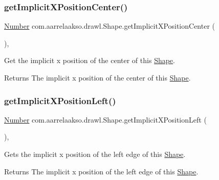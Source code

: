 \subsubsection{\texorpdfstring{get\+Implicit\+X\+Position\+Center()}{getImplicitXPositionCenter()}}
{\footnotesize\ttfamily \hyperlink{interfacecom_1_1aarrelaakso_1_1drawl_1_1_number}{Number} com.\+aarrelaakso.\+drawl.\+Shape.\+get\+Implicit\+X\+Position\+Center (\begin{DoxyParamCaption}{ }\end{DoxyParamCaption})\hspace{0.3cm}{\ttfamily [protected]}, {\ttfamily [inherited]}}



Get the implicit x position of the center of this \hyperlink{classcom_1_1aarrelaakso_1_1drawl_1_1_shape}{Shape}. 

\begin{DoxyReturn}{Returns}
The implicit x position of the center of this \hyperlink{classcom_1_1aarrelaakso_1_1drawl_1_1_shape}{Shape}. 
\end{DoxyReturn}
\mbox{\label{classcom_1_1aarrelaakso_1_1drawl_1_1_shape_a2f272e8bfa625bb7959d1f722d5ac3df}} 
\subsubsection{\texorpdfstring{get\+Implicit\+X\+Position\+Left()}{getImplicitXPositionLeft()}}
{\footnotesize\ttfamily \hyperlink{interfacecom_1_1aarrelaakso_1_1drawl_1_1_number}{Number} com.\+aarrelaakso.\+drawl.\+Shape.\+get\+Implicit\+X\+Position\+Left (\begin{DoxyParamCaption}{ }\end{DoxyParamCaption})\hspace{0.3cm}{\ttfamily [protected]}, {\ttfamily [inherited]}}



Gets the implicit x position of the left edge of this \hyperlink{classcom_1_1aarrelaakso_1_1drawl_1_1_shape}{Shape}. 

\begin{DoxyReturn}{Returns}
The implicit x position of the left edge of this \hyperlink{classcom_1_1aarrelaakso_1_1drawl_1_1_shape}{Shape}. 
\end{DoxyReturn}
\mbox{\label{classcom_1_1aarrelaakso_1_1drawl_1_1_shape_a15599ef4ee30a0ddd372f7cf1b155ce1}} 

